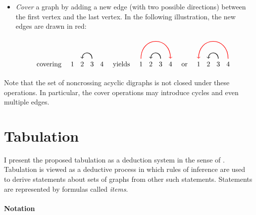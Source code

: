 \documentclass[a4paper]{article}
\begin{document}
\begin{itemize}
	\item \emph{Cover} a graph by adding a new edge (with two possible directions) between the first vertex and the last vertex. In the following illustration, the new edges are drawn in red:
	\begin{displaymath}
		\text{covering}
		\quad
		\begin{tikzpicture}[xscale=0.5, baseline=(n1.base)]
			\node (n1) at (0, 0) {$\mathstrut 1$};
			\node (n2) at (1, 0) {$\mathstrut 2$};
			\node (n3) at (2, 0) {$\mathstrut 3$};
			\node (n4) at (3, 0) {$\mathstrut 4$};
			\path[thick, ->] (n3) edge[out=90, in=90] (n2);
		\end{tikzpicture}
		\quad
		\text{yields}
		\quad
		\begin{tikzpicture}[xscale=0.5, baseline=(n1.base)]
			\node (n1) at (0, 0) {$\mathstrut 1$};
			\node (n2) at (1, 0) {$\mathstrut 2$};
			\node (n3) at (2, 0) {$\mathstrut 3$};
			\node (n4) at (3, 0) {$\mathstrut 4$};
			\path[thick, ->, red] (n1) edge[out=90, in=90] (n4);
			\path[thick, ->] (n3) edge[out=90, in=90] (n2);
		\end{tikzpicture}
		\quad
		\text{or}
		\quad
		\begin{tikzpicture}[xscale=0.5, baseline=(n1.base)]
			\node (n1) at (0, 0) {$\mathstrut 1$};
			\node (n2) at (1, 0) {$\mathstrut 2$};
			\node (n3) at (2, 0) {$\mathstrut 3$};
			\node (n4) at (3, 0) {$\mathstrut 4$};
			\path[thick, <-, red] (n1) edge[out=90, in=90] (n4);
			\path[thick, ->] (n3) edge[out=90, in=90] (n2);
		\end{tikzpicture}
	\end{displaymath}
\end{itemize}
Note that the set of noncrossing acyclic digraphs is not closed under these operations.
In particular, the cover operations may introduce cycles and even multiple edges.


\section{Tabulation}

I present the proposed tabulation as a deduction system in the sense of \citet{shieber1995principles}.
Tabulation is viewed as a deductive process in which rules of inference are used to derive statements about sets of graphs from other such statements.
Statements are represented by formulas called \emph{items}.

\paragraph{Notation}
\end{document}
